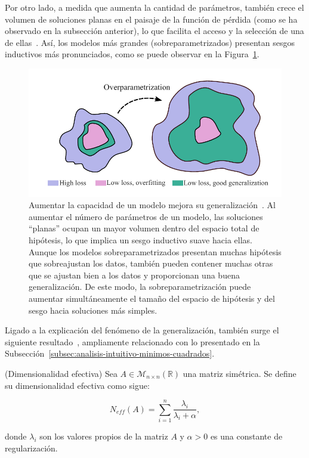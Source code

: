 Por otro lado, a medida que aumenta la cantidad de parámetros, también crece el volumen de soluciones planas en el paisaje de la función de pérdida (como se ha observado en la subsección anterior), lo que facilita el acceso y la selección de una de ellas~\cite{Huang2020}. Así, los modelos más grandes (sobreparametrizados) presentan sesgos inductivos más pronunciados, como se puede observar en la Figura~\ref{fig:overparametrization}.

\begin{figure}[h]
    \centering
    \includegraphics[width=0.5\linewidth]{img/overparametrization.png}
    \caption[Aumentar la capacidad de un modelo mejora su generalización~\cite{Wilson2025}.]{Aumentar la capacidad de un modelo mejora su generalización~\cite{Wilson2025}. Al aumentar el número de parámetros de un modelo, las soluciones ``planas'' ocupan un mayor volumen dentro del espacio total de hipótesis, lo que implica un sesgo inductivo suave hacia ellas. Aunque los modelos sobreparametrizados presentan muchas hipótesis que sobreajustan los datos, también pueden contener muchas otras que se ajustan bien a los datos y proporcionan una buena generalización. De este modo, la sobreparametrización puede aumentar simultáneamente el tamaño del espacio de hipótesis y del sesgo hacia soluciones más simples.}\label{fig:overparametrization}
\end{figure}

Ligado a la explicación del fenómeno de la generalización, también surge el siguiente resultado~\cite{Maddox2020}, ampliamente relacionado con lo presentado en la Subsección~\ref{subsec:analisis-intuitivo-minimos-cuadrados}.

\begin{definicion}(Dimensionalidad efectiva)
    Sea $A \in \mathcal{M}_{n \times n}(\mathbb{R})$ una matriz simétrica. Se define su dimensionalidad efectiva como sigue:

    \[
        N_{eff}(A) = \sum_{i=1}^{n}\frac{\lambda_i}{\lambda_i + \alpha},
    \]

    donde $\lambda_i$ son los valores propios de la matriz $A$ y $\alpha > 0$ es una constante de regularización.
\end{definicion}

